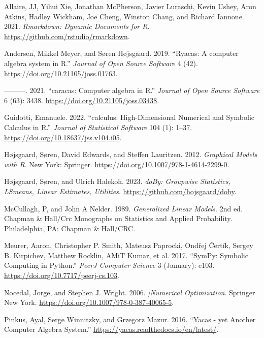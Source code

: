 \hypertarget{refs}{}
\begin{cslreferences}
\leavevmode\hypertarget{ref-rmarkdown}{}%
Allaire, JJ, Yihui Xie, Jonathan McPherson, Javier Luraschi, Kevin Ushey, Aron Atkins, Hadley Wickham, Joe Cheng, Winston Chang, and Richard Iannone. 2021. \emph{Rmarkdown: Dynamic Documents for R}. \url{https://github.com/rstudio/rmarkdown}.

\leavevmode\hypertarget{ref-ryacas}{}%
Andersen, Mikkel Meyer, and Søren Højsgaard. 2019. ``Ryacas: A computer algebra system in R.'' \emph{Journal of Open Source Software} 4 (42). \url{https://doi.org/10.21105/joss.01763}.

\leavevmode\hypertarget{ref-caracas:21}{}%
---------. 2021. ``caracas: Computer algebra in R.'' \emph{Journal of Open Source Software} 6 (63): 3438. \url{https://doi.org/10.21105/joss.03438}.

\leavevmode\hypertarget{ref-JSSv104i05}{}%
Guidotti, Emanuele. 2022. ``calculus: High-Dimensional Numerical and Symbolic Calculus in R.'' \emph{Journal of Statistical Software} 104 (1): 1--37. \url{https://doi.org/10.18637/jss.v104.i05}.

\leavevmode\hypertarget{ref-hojsgaard}{}%
Højsgaard, Søren, David Edwards, and Steffen Lauritzen. 2012. \emph{Graphical Models with R}. New York: Springer. \url{https://doi.org/10.1007/978-1-4614-2299-0}.

\leavevmode\hypertarget{ref-doBy}{}%
Højsgaard, Søren, and Ulrich Halekoh. 2023. \emph{doBy: Groupwise Statistics, LSmeans, Linear Estimates, Utilities}. \url{https://github.com/hojsgaard/doby}.

\leavevmode\hypertarget{ref-mccullagh}{}%
McCullagh, P, and John A Nelder. 1989. \emph{Generalized Linear Models}. 2nd ed. Chapman \& Hall/Crc Monographs on Statistics and Applied Probability. Philadelphia, PA: Chapman \& Hall/CRC.

\leavevmode\hypertarget{ref-sympy}{}%
Meurer, Aaron, Christopher P. Smith, Mateusz Paprocki, Ondřej Čertík, Sergey B. Kirpichev, Matthew Rocklin, AMiT Kumar, et al. 2017. ``SymPy: Symbolic Computing in Python.'' \emph{PeerJ Computer Science} 3 (January): e103. \url{https://doi.org/10.7717/peerj-cs.103}.

\leavevmode\hypertarget{ref-nocedal}{}%
Nocedal, Jorge, and Stephen J. Wright. 2006. \emph{{[}Numerical Optimization}. Springer New York. \url{https://doi.org/10.1007/978-0-387-40065-5}.

\leavevmode\hypertarget{ref-yacas}{}%
Pinkus, Ayal, Serge Winnitzky, and Grzegorz Mazur. 2016. ``Yacas - yet Another Computer Algebra System.'' \url{https://yacas.readthedocs.io/en/latest/}.


\end{cslreferences}
